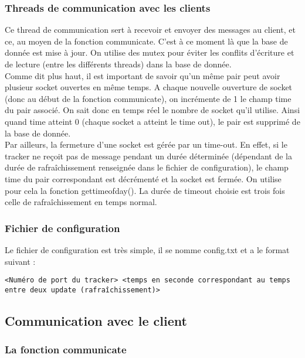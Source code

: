 \subsubsection{Threads de communication avec les clients}
Ce thread de communication sert à recevoir et envoyer des messages au client, et ce, au moyen de la fonction communicate. C'est à ce moment là que la base de donnée est mise à jour. On utilise des mutex pour éviter les conflits d'écriture et de lecture (entre les différents threads) dans la base de donnée.\\ 

Comme dit plus haut, il est important de savoir qu'un même pair peut avoir plusieur socket ouvertes en même temps. A chaque nouvelle ouverture de socket (donc au début de la fonction communicate), on incrémente de 1 le champ time du pair associé. On sait donc en temps réel le nombre de socket qu'il utilise. Ainsi quand time atteint 0 (chaque socket a atteint le time out), le pair est supprimé de la base de donnée.\\ 

Par ailleurs, la fermeture d'une socket est gérée par un time-out. En effet, si le tracker ne reçoit pas de message pendant un durée déterminée (dépendant de la durée de rafraîchissement renseignée dans le fichier de configuration), le champ time du pair correspondant est décrémenté et la socket est fermée. On utilise pour cela la fonction gettimeofday(). La durée de timeout choisie est trois fois celle de rafraîchissement en temps normal.

\subsubsection{Fichier de configuration}
Le fichier de configuration est très simple, il se nomme config.txt et a le format suivant :
\begin{verbatim}
<Numéro de port du tracker> <temps en seconde correspondant au temps entre deux update (rafraîchissement)>
\end{verbatim}


\subsection{Communication avec le client}
\subsubsection{La fonction communicate}

